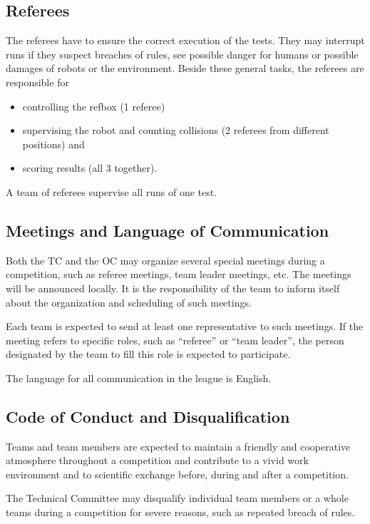 \subsection{Referees}
The referees have to ensure the correct execution of the tests. They may interrupt runs if they suspect breaches of rules, see possible danger for humans or possible damages of robots or the environment. Beside these general tasks, the referees are responsible for
\begin{itemize}
\item controlling the refbox (1 referee)
\item supervising the robot and counting collisions (2 referees from different positions) and
\item scoring results (all 3 together).
\end{itemize}
A team of referees supervise all runs of one test. 


\subsection{Meetings and Language of Communication}
Both the TC and the OC may organize several special meetings during a competition, such as referee meetings, team leader meetings, etc. The meetings will be announced locally. It is the responsibility of the team to inform itself about the organization and scheduling of such meetings.
\par
Each team is expected to send at least one representative to such meetings. If the meeting refers to specific roles, such as “referee” or “team leader”, the person designated by the team to fill this role is expected to participate.
\par
The language for all communication in the league is English.

\subsection{Code of Conduct and Disqualification}
Teams and team members are expected to maintain a friendly and cooperative atmosphere throughout a competition and contribute to a vivid work environment and to scientific exchange before, during and after a competition.
\par
The Technical Committee may disqualify individual team members or a whole teams during a competition for severe reasons, such as repeated breach of rules.
